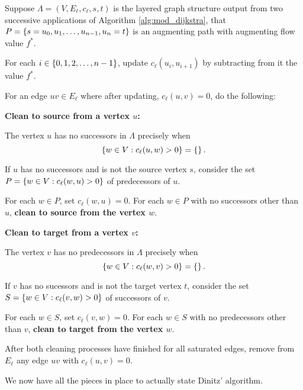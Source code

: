 \documentclass[m3380-lec-main.tex]{subfiles}
\begin{document}
\begin{alg}\label{alg:maint}
Suppose $\Lambda = (V,E_\ell,c_\ell,s,t)$ is the layered graph structure output from two successive applications of Algorithm \ref{alg:mod_dijkstra}, that $P=\left\{s=u_0,u_1,\ldots,u_{n-1},u_n=t\right\}$ is an augmenting path with augmenting flow value $f^*$.
\begin{enum}
\item For each $i\in\left\{0,1,2,\ldots,n-1\right\}$, update $c_\ell(u_i,u_{i+1})$ by subtracting from it the value $f^*$.
\item For an edge $uv\in E_\ell$ where after updating, $c_\ell(u,v)=0$, do the following:\medskip

\textbf{Clean to source from a vertex $u$:}
\begin{enuma}
\item The vertex $u$ has no successors in $\Lambda$ precisely when \[\left\{w\in V: c_\ell(u,w)>0\right\}=\left\{\right\}.\] 
\item If $u$ has no successors and is not the source vertex $s$, consider the set ${P=\left\{w\in V:c_\ell(w,u)>0\right\}}$ of predecessors of $u$. 
\item For each $w\in P$, set $c_\ell(w,u)=0$. For each $w\in P$ with no successors other than $u$, \textbf{clean to source from the vertex $w$}.
\end{enuma}
\newpage

\textbf{Clean to target from a vertex $v$:}
\begin{enuma}
\item The vertex $v$ has no predecessors in $\Lambda$ precisely when \[\left\{w\in V:c_\ell(w,v)>0\right\}=\left\{\right\}.\]
\item If $v$ has no sucessors and is not the target vertex $t$, consider the set $S=\left\{w\in V:c_\ell(v,w)>0\right\}$ of successors of $v$.
\item For each $w\in S$, set $c_\ell(v,w)=0$. For each $w\in S$ with no predecessors other than $v$, \textbf{clean to target from the vertex $w$}.
\end{enuma}

\item After both cleaning processes have finished for all saturated edges, remove from $E_\ell$ any edge $uv$ with $c_\ell(u,v)=0$.
\end{enum}
\end{alg}

We now have all the pieces in place to actually state Dinitz' algorithm.
\end{document}
